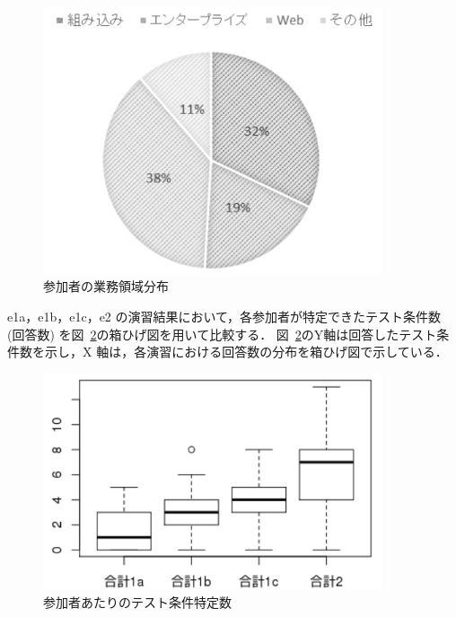    \begin{figure}[h]
  \begin{center}
  \includegraphics[width=10cm]{./image/D-3-Fig7.png}
  \caption{参加者の業務領域分布}
  \label{fig:D-3-Fig7}
  \end{center}
   \end{figure}

e1a，e1b，e1c，e2 の演習結果において，各参加者が特定できたテスト条件数 (回答数) を図~\ref{fig:D-3-Fig10}の箱ひげ図を用いて比較する．
図~\ref{fig:D-3-Fig10}のY軸は回答したテスト条件数を示し，X 軸は，各演習における回答数の分布を箱ひげ図で示している．

\begin{figure}[htbp]
  \begin{center}
  \includegraphics[width=10cm]{./image/D-3-Fig10.png}
  \caption{参加者あたりのテスト条件特定数}
  \label{fig:D-3-Fig10}
  \end{center}
\end{figure}


